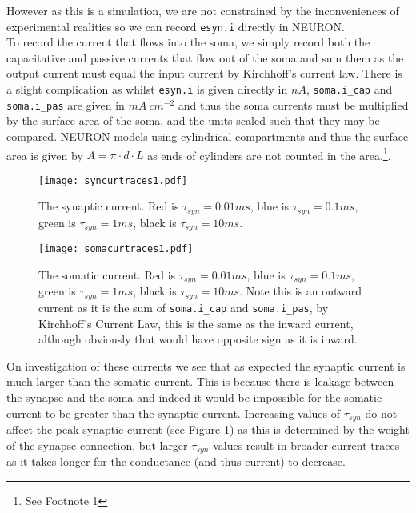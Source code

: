 \documentclass[paper=a4, fontsize=11pt]{scrartcl} %
\numberwithin{equation}{section} %
\numberwithin{figure}{section} %
\numberwithin{table}{section} %
\begin{document}
However as this is a simulation, we are not constrained by the inconveniences of experimental realities so we can record \texttt{esyn.i} directly in NEURON.\\

To record the current that flows into the soma, we simply record both the capacitative and passive currents that flow out of the soma and sum them as the output current must equal the input current by Kirchhoff's current law. There is a slight complication as whilst \texttt{esyn.i} is given directly in $nA$, \texttt{soma.i\_cap} and \texttt{soma.i\_pas} are given in $mA~cm^{-2}$ and thus the soma currents must be multiplied by the surface area of the soma, and the units scaled such that they may be compared. NEURON models using cylindrical compartments and thus the surface area is given by $A = \pi \cdot d \cdot L$ as ends of cylinders are not counted in the area.\footnote{See Footnote 1}.\\



\begin{figure}[!h]
\centering
\texttt{[image: syncurtraces1.pdf]}
  \caption{The synaptic current. Red is $\tau_{syn}=0.01ms$, blue is $\tau_{syn}=0.1ms$, green is $\tau_{syn}=1ms$, black is $\tau_{syn}=10ms$.}
  \label{fig:syncurtrace1}
\end{figure}


\begin{figure}[!h]
\centering
\texttt{[image: somacurtraces1.pdf]}
  \caption{The somatic current. Red is $\tau_{syn}=0.01ms$, blue is $\tau_{syn}=0.1ms$, green is $\tau_{syn}=1ms$, black is $\tau_{syn}=10ms$. Note this is an outward current as it is the sum of \texttt{soma.i\_cap} and \texttt{soma.i\_pas}, by Kirchhoff's Current Law, this is the same as the inward current, although obviously that would have opposite sign as it is inward. }
  \label{fig:somacurtrace1}
\end{figure}

On investigation of these currents we see that as expected the synaptic current is much larger than the somatic current. This is because there is leakage between the synapse and the soma and indeed it would be impossible for the somatic current to be greater than the synaptic current. Increasing values of $\tau_{syn}$ do not affect the peak synaptic current (see Figure \ref{fig:syncurtrace1}) as this is determined by the weight of the synapse connection, but larger $\tau_{syn}$ values result in broader current traces as it takes longer for the conductance (and thus current) to decrease.\\
\end{document}
